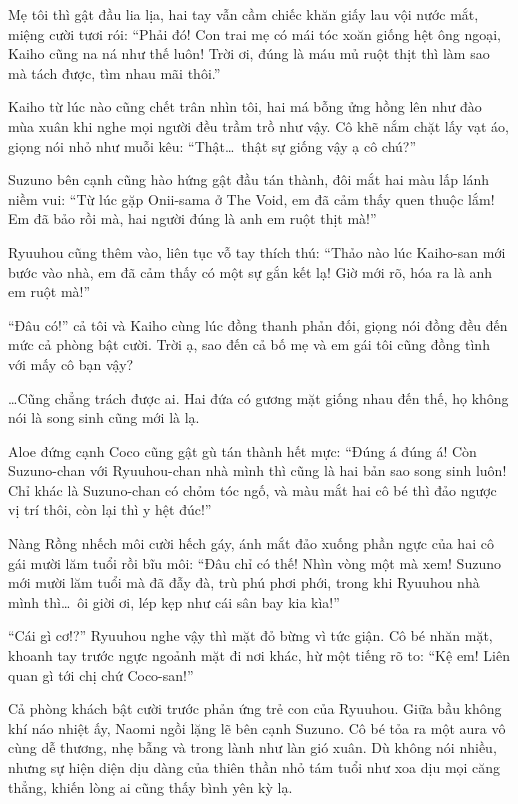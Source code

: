 ﻿\documentclass[../main.tex]{subfiles}
\begin{document}
Mẹ tôi thì gật đầu lia lịa, hai tay vẫn cầm chiếc khăn giấy lau vội nước mắt, miệng cười tươi rói: ``Phải đó! Con trai mẹ có mái tóc xoăn giống hệt ông ngoại, Kaiho cũng na ná như thế luôn! Trời ơi, đúng là máu mủ ruột thịt thì làm sao mà tách được, tìm nhau mãi thôi.''

Kaiho từ lúc nào cũng chết trân nhìn tôi, hai má bỗng ửng hồng lên như đào mùa xuân khi nghe mọi người đều trầm trồ như vậy. Cô khẽ nắm chặt lấy vạt áo, giọng nói nhỏ như muỗi kêu: ``Thật\dots\ thật sự giống vậy ạ cô chú?''

Suzuno bên cạnh cũng hào hứng gật đầu tán thành, đôi mắt hai màu lấp lánh niềm vui: ``Từ lúc gặp Onii-sama ở The Void, em đã cảm thấy quen thuộc lắm! Em đã bảo rồi mà, hai người đúng là anh em ruột thịt mà!''

Ryuuhou cũng thêm vào, liên tục vỗ tay thích thú: ``Thảo nào lúc Kaiho-san mới bước vào nhà, em đã cảm thấy có một sự gắn kết lạ! Giờ mới rõ, hóa ra là anh em ruột mà!''

``Đâu có!'' cả tôi và Kaiho cùng lúc đồng thanh phản đối, giọng nói đồng đều đến mức cả phòng bật cười. Trời ạ, sao đến cả bố mẹ và em gái tôi cũng đồng tình với mấy cô bạn vậy?

\dots Cũng chẳng trách được ai. Hai đứa có gương mặt giống nhau đến thế, họ không nói là song sinh cũng mới là lạ.

Aloe đứng cạnh Coco cũng gật gù tán thành hết mực: ``Đúng á đúng á! Còn Suzuno-chan với Ryuuhou-chan nhà mình thì cũng là hai bản sao song sinh luôn! Chỉ khác là Suzuno-chan có chỏm tóc ngố, và màu mắt hai cô bé thì đảo ngược vị trí thôi, còn lại thì y hệt đúc!''

Nàng Rồng nhếch môi cười hếch gáy, ánh mắt đảo xuống phần ngực của hai cô gái mười lăm tuổi rồi bĩu môi: ``Đâu chỉ có thế! Nhìn vòng một mà xem! Suzuno mới mười lăm tuổi mà đã đẫy đà, trù phú phơi phới, trong khi Ryuuhou nhà mình thì\dots\ ôi giời ơi, lép kẹp như cái sân bay kia kìa!''

``Cái gì cơ!?'' Ryuuhou nghe vậy thì mặt đỏ bừng vì tức giận. Cô bé nhăn mặt, khoanh tay trước ngực ngoảnh mặt đi nơi khác, hừ một tiếng rõ to: ``Kệ em! Liên quan gì tới chị chứ Coco-san!''

Cả phòng khách bật cười trước phản ứng trẻ con của Ryuuhou. Giữa bầu không khí náo nhiệt ấy, Naomi ngồi lặng lẽ bên cạnh Suzuno. Cô bé tỏa ra một aura vô cùng dễ thương, nhẹ bẫng và trong lành như làn gió xuân. Dù không nói nhiều, nhưng sự hiện diện dịu dàng của thiên thần nhỏ tám tuổi như xoa dịu mọi căng thẳng, khiến lòng ai cũng thấy bình yên kỳ lạ.
\end{document}
